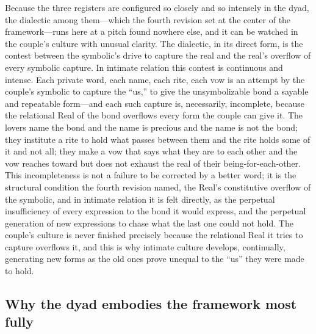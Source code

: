 Because the three registers are configured so closely and so intensely in the dyad, the dialectic among them---which the fourth revision set at the center of the framework---runs here at a pitch found nowhere else, and it can be watched in the couple's culture with unusual clarity. The dialectic, in its direct form, is the contest between the symbolic's drive to capture the real and the real's overflow of every symbolic capture. In intimate relation this contest is continuous and intense. Each private word, each name, each rite, each vow is an attempt by the couple's symbolic to capture the ``us,'' to give the unsymbolizable bond a sayable and repeatable form---and each such capture is, necessarily, incomplete, because the relational Real of the bond overflows every form the couple can give it. The lovers name the bond and the name is precious and the name is not the bond; they institute a rite to hold what passes between them and the rite holds some of it and not all; they make a vow that says what they are to each other and the vow reaches toward but does not exhaust the real of their being-for-each-other. This incompleteness is not a failure to be corrected by a better word; it is the structural condition the fourth revision named, the Real's constitutive overflow of the symbolic, and in intimate relation it is felt directly, as the perpetual insufficiency of every expression to the bond it would express, and the perpetual generation of new expressions to chase what the last one could not hold. The couple's culture is never finished precisely because the relational Real it tries to capture overflows it, and this is why intimate culture develops, continually, generating new forms as the old ones prove unequal to the ``us'' they were made to hold.

\subsection*{Why the dyad embodies the framework most fully}


